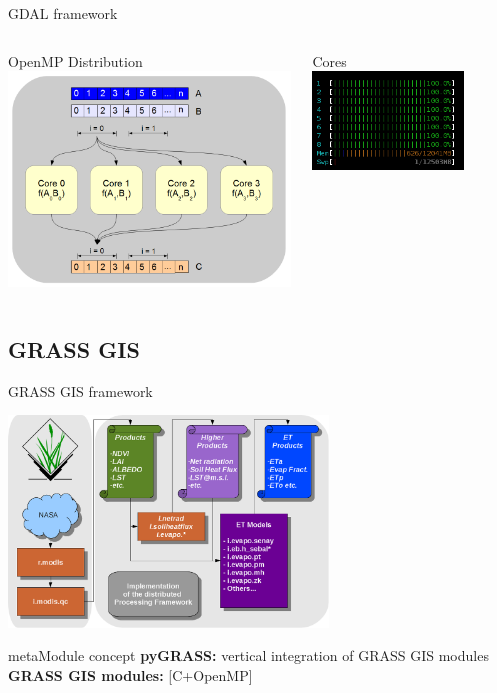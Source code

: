 \documentclass[xcolor=dvipsnames,beamer]{beamer} %
\begin{document}
\begin{frame}[fragile]{GDAL framework}

\begin{columns}[l]
\begin{center}
 OpenMP Distribution \\
 \includegraphics[width=7.5cm]{chain1}
\end{center}
\begin{center}
 Cores \\
 \includegraphics[width=4cm]{cores}
\end{center}
\end{columns}
\end{frame}


\subsection{GRASS GIS}
\begin{frame}[fragile]{GRASS GIS framework}

\begin{center}
 \includegraphics[width=8.5cm]{architecture_implementation}
\end{center}

\begin{block}{metaModule concept}
{\bf pyGRASS:} vertical integration of GRASS GIS modules\\
{\bf GRASS GIS modules:} [C+OpenMP]
\end{block}

\end{frame}
\end{document}
